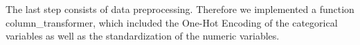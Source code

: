 \documentclass[12pt, letterpaper]{article}
\begin{document}





The last step consists of data preprocessing. Therefore we implemented a function column\_transformer, which included the One-Hot Encoding of the categorical variables as well as the standardization of the numeric variables. 



\newpage



\end{document}

